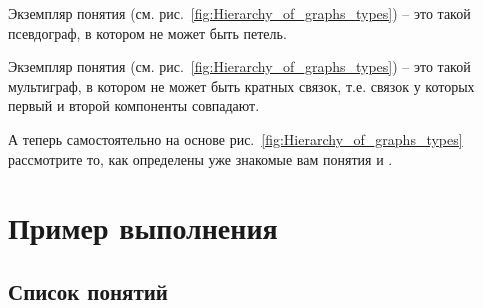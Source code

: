 Экземпляр понятия 
(см. рис.~\ref{fig:Hierarchy_of_graphs_types}) – это такой псевдограф,
в котором не может быть петель.
 
Экземпляр понятия 
(см. рис.~\ref{fig:Hierarchy_of_graphs_types}) – это такой мультиграф,
в котором не может быть кратных связок, т.е. связок у которых первый и
второй компоненты совпадают.

А теперь самостоятельно на основе
рис.~\ref{fig:Hierarchy_of_graphs_types} рассмотрите то, как
определены уже знакомые вам понятия  и
. 

\newpage

\section{Пример выполнения}
\label{sec:onto_example}

\subsection{Список понятий}
\label{sec:onto_ex_concepts}

